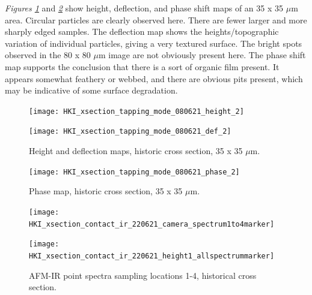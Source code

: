 \textit{Figures \ref{fig:afm_xsection_height_def_2}} and \textit{\ref{fig:afm_xsection_phase_2}} show height, deflection, and phase shift maps of an 35 x 35 $\mu$m area. Circular particles are clearly observed here. There are fewer larger and more sharply edged samples. The deflection map shows the heights/topographic variation of individual particles, giving a very textured surface. The bright spots observed in the 80 x 80 $\mu$m image are not obviously present here. The phase shift map supports the conclusion that there is a sort of organic film present. It appears somewhat feathery or webbed, and there are obvious pits present, which may be indicative of some surface degradation.

\begin{figure}[H]
\centering
\begin{minipage}{.45\textwidth}
  \centering
  \texttt{[image: HKI\_xsection\_tapping\_mode\_080621\_height\_2]}
\end{minipage}
\begin{minipage}{.45\textwidth}
  \centering
  \texttt{[image: HKI\_xsection\_tapping\_mode\_080621\_def\_2]}
\end{minipage}
\caption[Height and deflection maps, historic cross section]{Height and deflection maps, historic cross section, 35 x 35 $\mu$m.}
\label{fig:afm_xsection_height_def_2}
\end{figure}

\begin{figure}[H]
\centering
  \texttt{[image: HKI\_xsection\_tapping\_mode\_080621\_phase\_2]}
\caption[Phase map, historic cross section]{Phase map, historic cross section, 35 x 35 $\mu$m.}
\label{fig:afm_xsection_phase_2}
\end{figure}



\begin{figure}[H]
\centering
\begin{minipage}{.45\textwidth}
  \centering
  \texttt{[image: HKI\_xsection\_contact\_ir\_220621\_camera\_spectrum1to4marker]}
\end{minipage}
\begin{minipage}{.45\textwidth}
  \centering
  \texttt{[image: HKI\_xsection\_contact\_ir\_220621\_height1\_allspectrummarker]}
\end{minipage}
\caption[AFM-IR point spectra sampling locations, historical cross section]{AFM-IR point spectra sampling locations 1-4, historical cross section.}
\label{fig:afm_xsection_camera_speclocs_height_1}
\end{figure}

